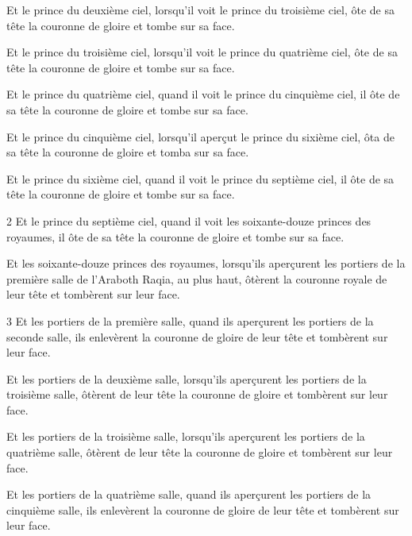 \par Et le prince du deuxième ciel, lorsqu'il voit le prince du troisième ciel, ôte de sa tête la couronne de gloire et tombe sur sa face.

\par Et le prince du troisième ciel, lorsqu'il voit le prince du quatrième ciel, ôte de sa tête la couronne de gloire et tombe sur sa face.

\par Et le prince du quatrième ciel, quand il voit le prince du cinquième ciel, il ôte de sa tête la couronne de gloire et tombe sur sa face.

\par Et le prince du cinquième ciel, lorsqu'il aperçut le prince du sixième ciel, ôta de sa tête la couronne de gloire et tomba sur sa face.

\par Et le prince du sixième ciel, quand il voit le prince du septième ciel, il ôte de sa tête la couronne de gloire et tombe sur sa face.

\par 2 Et le prince du septième ciel, quand il voit les soixante-douze princes des royaumes, il ôte de sa tête la couronne de gloire et tombe sur sa face.

\par Et les soixante-douze princes des royaumes, lorsqu'ils aperçurent les portiers de la première salle de l'Araboth Raqia, au plus haut, ôtèrent la couronne royale de leur tête et tombèrent sur leur face.

\par 3 Et les portiers de la première salle, quand ils aperçurent les portiers de la seconde salle, ils enlevèrent la couronne de gloire de leur tête et tombèrent sur leur face.

\par Et les portiers de la deuxième salle, lorsqu'ils aperçurent les portiers de la troisième salle, ôtèrent de leur tête la couronne de gloire et tombèrent sur leur face.

\par Et les portiers de la troisième salle, lorsqu'ils aperçurent les portiers de la quatrième salle, ôtèrent de leur tête la couronne de gloire et tombèrent sur leur face.

\par Et les portiers de la quatrième salle, quand ils aperçurent les portiers de la cinquième salle, ils enlevèrent la couronne de gloire de leur tête et tombèrent sur leur face.

